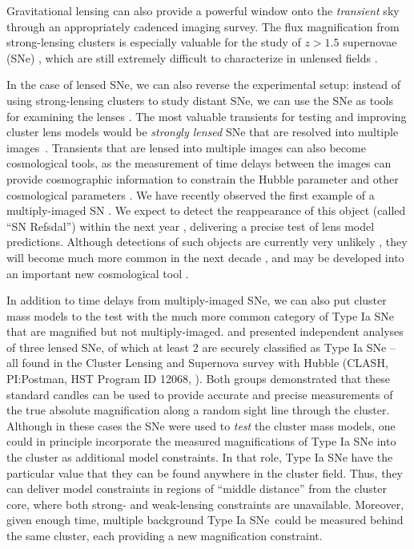 \documentclass[iop]{emulateapj}
\newcommand{\SNeIa}{Type Ia SNe}
\begin{document}
Gravitational lensing can also provide a powerful window onto the {\it
transient} sky through an appropriately cadenced imaging survey.  The
flux magnification from strong-lensing clusters is especially valuable
for the study of $z>1.5$ supernovae
(SNe) \citep[e.g.][]{Kovner:1988,Kolatt:1998,Sullivan:2000,Saini:2000,Gunnarsson:2003,Goobar:2009,Postman:2012},
which are still extremely difficult to characterize in unlensed
fields \citep[e.g.][]{Riess:2001,Riess:2007,Suzuki:2012,Rodney:2012,Rubin:2013,Jones:2013}.


In the case of lensed SNe, we can also reverse the experimental setup:
instead of using strong-lensing clusters to study distant SNe, we can
use the SNe as tools for examining the lenses \citep{Riehm:2011}.  The
most valuable transients for testing and improving cluster lens models
would be {\it strongly lensed} SNe that are resolved into multiple
images\ \citep{Holz:2001,Oguri:2003}.  Transients that are lensed into
multiple images can also become cosmological tools, as the measurement
of time delays between the images can provide cosmographic information
to constrain the Hubble parameter \citep{Refsdal:1964} and other
cosmological parameters \citep{Linder:2011}.  We have recently
observed the first example of a multiply-imaged SN \citep{Kelly:2015}.
We expect to detect the reappearance of this object (called ``SN
Refsdal'') within the next
year \citep{Oguri:2015,Sharon:2015,Diego:2015}, delivering a precise
test of lens model predictions.  Although detections of such objects
are currently very unlikely \citep{Li:2012}, they will become much
more common in the next decade \citep{Coe:2009,Dobke:2009}, and may be
developed into an important new cosmological
tool \citep{Oguri:2010,Linder:2011}.


In addition to time delays from multiply-imaged SNe, we can also
put cluster mass models to the test with the much more common category
of Type Ia SNe that are magnified but not multiply-imaged.  
\citet[][hereafter P14]{Patel:2014} and \citet{Nordin:2014} presented
independent analyses of three lensed SNe, of which at least 2 are
securely classified as Type Ia SNe -- all found in the Cluster Lensing
and Supernova survey with Hubble (CLASH, PI:Postman, HST Program ID
12068, \citealt{Postman:2012}).  Both groups demonstrated that these
standard candles can be used to provide accurate and precise
measurements of the true absolute magnification along a random sight
line through the cluster.  Although in these cases the SNe were used
to {\it test} the cluster mass models, one could in principle
incorporate the measured magnifications of Type Ia SNe into the
cluster as additional model constraints.  In that role, Type Ia SNe
have the particular value that they can be found anywhere in the
cluster field.  Thus, they can deliver model constraints in regions of
``middle distance'' from the cluster core, where both strong- and
weak-lensing constraints are unavailable. Moreover, given
enough time, multiple background \SNeIa\ could be measured behind the
same cluster, each providing a new magnification constraint.
\end{document}
